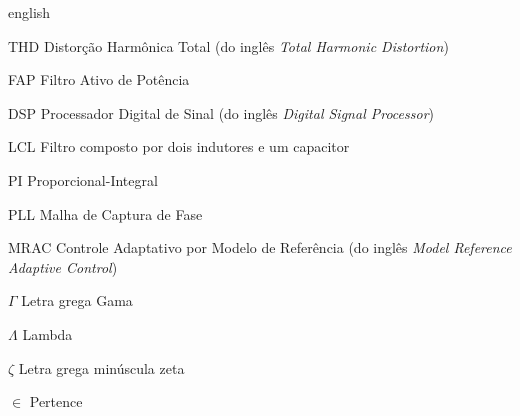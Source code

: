 \documentclass[12pt,openright,twoside,a4paper,english,french,spanish,
                sumario=tradicional,brazil]{abntex2}
\begin{document}

\begin{resumo}
 
\end{resumo}

\begin{resumo}[Abstract]
 \begin{otherlanguage*}{english}
  
 \end{otherlanguage*}
\end{resumo}

\listoffigures*
\cleardoublepage

\listoftables*
\cleardoublepage

\begin{siglas}
 \item[THD]  Distorção Harmônica Total (do inglês \emph{Total Harmonic Distortion})
 \item[FAP]  Filtro Ativo de Potência
 \item[DSP]  Processador Digital de Sinal (do inglês \emph{Digital Signal Processor})
 \item[LCL]  Filtro composto por dois indutores e um capacitor
 \item[PI]   Proporcional-Integral
 \item[PLL]  Malha de Captura de Fase
 \item[MRAC] Controle Adaptativo por Modelo de Referência (do inglês \emph{Model Reference Adaptive Control})
\end{siglas}

\begin{simbolos}
 \item[$ \Gamma $] Letra grega Gama
 \item[$ \Lambda $] Lambda
 \item[$ \zeta $] Letra grega minúscula zeta
 \item[$ \in $] Pertence
\end{simbolos}

\tableofcontents*
\cleardoublepage



\textual
\end{document}

